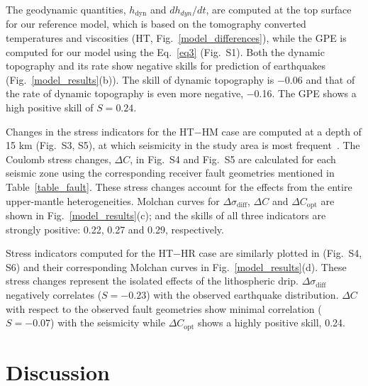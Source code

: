 \documentclass[draft,linenumbers]{agujournal2018}
\begin{document}
The geodynamic quantities, $h_{\text{dyn}}$ and $dh_{dyn}/dt$, are computed at the top surface for our reference model, which is based on the tomography converted temperatures and viscosities (HT, Fig.~\ref{model_differences}), while the GPE is computed for our model using the Eq.~\ref{eq3} (Fig.~S1).
Both the dynamic topography and its rate show negative skills for prediction of earthquakes (Fig.~\ref{model_results}(b)). The skill of dynamic topography is $-$0.06 and that of the rate of dynamic topography is even more negative, $-$0.16.
The GPE shows a high positive skill of $S=0.24$.

Changes in the stress indicators for the HT$-$HM case are computed at a depth of 15 km (Fig.~S3, S5), at which seismicity in the study area is most frequent~\citep[e.g.,][]{mazzotti2010state}. The Coulomb stress changes, $\Delta C$, in Fig.~S4 and Fig.~S5 are calculated for each seismic zone using the corresponding receiver fault geometries mentioned in Table~\ref{table_fault}. These stress changes account for the effects from the entire upper-mantle heterogeneities. Molchan curves for $\Delta \sigma_{\text{diff}}$, $\Delta C$ and $\Delta C_{\text{opt}}$ are shown in Fig.~\ref{model_results}(c); and the skills of all three indicators are strongly positive: 0.22, 0.27 and 0.29, respectively. 

Stress indicators computed for the HT$-$HR case are similarly plotted in (Fig.~S4, S6) and their corresponding Molchan curves in Fig.~\ref{model_results}(d). These stress changes represent the isolated effects of the lithospheric drip. $\Delta \sigma_{\text{diff}}$ negatively correlates ($S=-0.23$) with the observed earthquake distribution. $\Delta C$ with respect to the observed fault geometries show minimal correlation ($S=-0.07$) with the seismicity while $\Delta C_{\text{opt}}$ shows a highly positive skill, 0.24.
%
\section{Discussion}
\end{document}
